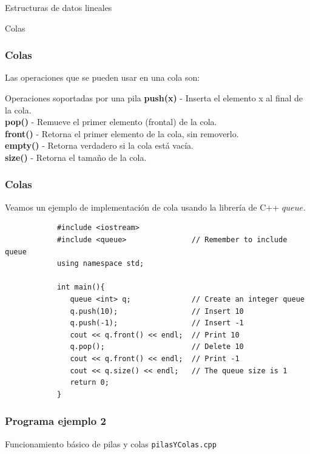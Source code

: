 \documentclass{beamer}
\begin{document}
\begin{section}{Estructuras de datos lineales}
\begin{subsection}{Colas}
	\begin{frame}[fragile]
		\frametitle{Colas}
		Las operaciones que se pueden usar en una cola son:
		\begin{block}{Operaciones soportadas por una pila}
			\textbf{push(x)} - Inserta el elemento x al final de la cola.\\
			\textbf{pop()} - Remueve el primer elemento (frontal) de la cola.\\
			\textbf{front()} - Retorna el primer elemento de la cola, sin removerlo.\\
			\textbf{empty()} - Retorna verdadero si la cola está vacía.\\
			\textbf{size()} - Retorna el tamaño de la cola.			
		\end{block}		
	\end{frame}
	
	\begin{frame}[fragile]
		\frametitle{Colas}
		Veamos un ejemplo de implementación de cola usando la librería de C++ $queue$.
		\begin{lstlisting}
			#include <iostream>
			#include <queue>               // Remember to include queue
			using namespace std;

			int main(){
			   queue <int> q;              // Create an integer queue
			   q.push(10);                 // Insert 10
			   q.push(-1);                 // Insert -1
			   cout << q.front() << endl;  // Print 10
			   q.pop();                    // Delete 10
			   cout << q.front() << endl;  // Print -1
			   cout << q.size() << endl;   // The queue size is 1
			   return 0;
			}
		\end{lstlisting}
	\end{frame}

	\begin{frame}[fragile]
		\frametitle{Programa ejemplo 2}
		 Funcionamiento básico de pilas y colas
		\texttt{pilasYColas.cpp}\\

	\end{frame}
\end{subsection}	

\end{section}
\end{document}
